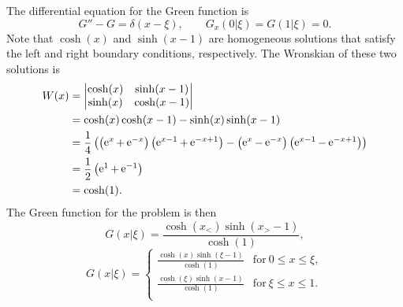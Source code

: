 {%
\begin{Solution}
  \label{solution y-y=f y0=y1=0}
  The differential equation for the Green function is
  \[
  G'' - G = \delta(x - \xi), \qquad G_x(0|\xi) = G(1|\xi) = 0.
  \]
  Note that $\cosh(x)$ and $\sinh(x-1)$ are homogeneous solutions that satisfy
  the left and right boundary conditions, respectively.  The Wronskian of 
  these two solutions is
  \begin{align*}
    W(x)    &= \begin{vmatrix} \cosh(x) & \sinh(x-1) \\ \sinh(x) & \cosh(x-1)
    \end{vmatrix} \\
    &= \cosh(x) \cosh(x-1) - \sinh(x) \sinh(x-1) \\
    &= \frac{1}{4} \left( \left( \mathop{\mathrm{e}}\nolimits^x + \mathop{\mathrm{e}}\nolimits^{-x} \right)
      \left( \mathop{\mathrm{e}}\nolimits^{x-1} + \mathop{\mathrm{e}}\nolimits^{-x+1} \right) 
      - \left( \mathop{\mathrm{e}}\nolimits^x - \mathop{\mathrm{e}}\nolimits^{-x} \right)
      \left( \mathop{\mathrm{e}}\nolimits^{x-1} - \mathop{\mathrm{e}}\nolimits^{-x+1} \right) \right) \\
    &= \frac{1}{2} \left( \mathop{\mathrm{e}}\nolimits^1 + \mathop{\mathrm{e}}\nolimits^{-1} \right) \\
    &= \cosh(1).
  \end{align*}
  The Green function for the problem is then
  \[
  G(x|\xi) = \frac{ \cosh(x_<) \sinh(x_> - 1) }{ \cosh(1) },
  \]
  \[
  \boxed{
    G(x|\xi) = \begin{cases}
      \frac{ \cosh(x) \sinh(\xi-1) }{ \cosh(1) } &\mathrm{for}\ 0 \leq x \leq \xi, \\
      \frac{ \cosh(\xi) \sinh(x-1) }{ \cosh(1) } &\mathrm{for}\ \xi \leq x \leq 1. \\
    \end{cases}
    }
  \]
\end{Solution}





}
